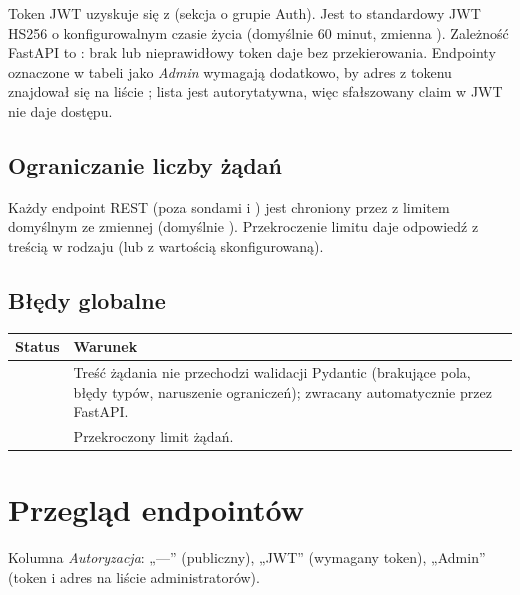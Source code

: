 Token JWT uzyskuje się z  (sekcja o grupie Auth). Jest to standardowy
JWT HS256 o konfigurowalnym czasie życia (domyślnie 60 minut, zmienna ).
Zależność FastAPI to :
brak lub nieprawidłowy token daje  bez przekierowania. Endpointy oznaczone w tabeli jako
\emph{Admin} wymagają dodatkowo, by adres z tokenu znajdował się na liście ;
lista jest autorytatywna, więc sfałszowany claim  w JWT nie daje dostępu.

\subsection{Ograniczanie liczby żądań}

Każdy endpoint REST (poza sondami  i ) jest chroniony przez
 z limitem domyślnym ze zmiennej  (domyślnie
). Przekroczenie limitu daje odpowiedź 
z treścią w rodzaju 
(lub z wartością skonfigurowaną).

\subsection{Błędy globalne}

\begin{tabularx}{\textwidth}{lY}
\toprule
Status & Warunek \\
\midrule
{} & Treść żądania nie przechodzi walidacji Pydantic (brakujące pola, błędy typów, naruszenie ograniczeń); zwracany automatycznie przez FastAPI. \\
 & Przekroczony limit żądań. \\
\bottomrule
\end{tabularx}

\section{Przegląd endpointów}
\label{sec:api-przeglad}

Kolumna \emph{Autoryzacja}: „---” (publiczny), „JWT” (wymagany token), „Admin” (token i adres na
liście administratorów).

